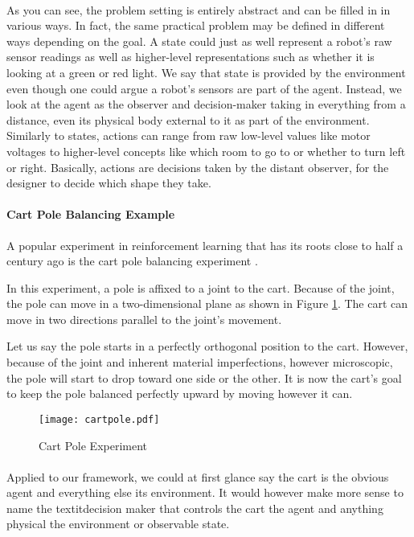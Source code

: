 \paragraph{}
As you can see, the problem setting is entirely abstract
and can be filled in in various ways.
In fact, the same practical problem may be defined in different ways
depending on the goal.
A state could just as well represent a robot's raw sensor readings
as well as higher-level representations
such as whether it is looking at a green or red light.
We say that state is provided by the environment
even though one could argue a robot's sensors
are part of the agent.
Instead, we look at the agent as the observer and decision-maker
taking in everything from a distance,
even its physical body external to it
as part of the environment.
Similarly to states,
actions can range from raw low-level values
like motor voltages
to higher-level concepts like which room to go to
or whether to turn left or right.
Basically, actions are decisions taken by the distant observer,
for the designer to decide which shape they take.

\paragraph{Cart Pole Balancing Example}
A popular experiment in reinforcement learning
that has its roots close to half a century ago
is the cart pole balancing experiment
\parencite{Michie1968}.

In this experiment,
a pole is affixed to a joint to the cart.
Because of the joint,
the pole can move in a two-dimensional plane
as shown in Figure \ref{fig:cartpole}.
The cart can move in two directions
parallel to the joint's movement.

Let us say the pole starts in a perfectly orthogonal
position to the cart.
However, because of the joint and
inherent material imperfections, however microscopic,
the pole will start to drop toward one side or the other.
It is now the cart's goal
to keep the pole balanced perfectly upward
by moving however it can.

\begin{figure}[ht]
  \centering
  \texttt{[image: cartpole.pdf]}
  \caption{Cart Pole Experiment}
  \label{fig:cartpole}
\end{figure}

\paragraph{}
Applied to our framework,
we could at first glance say the cart is the obvious agent
and everything else its environment.
It would however make more sense
to name the textit{decision maker} that controls the cart the agent
and anything physical the environment or observable state.


